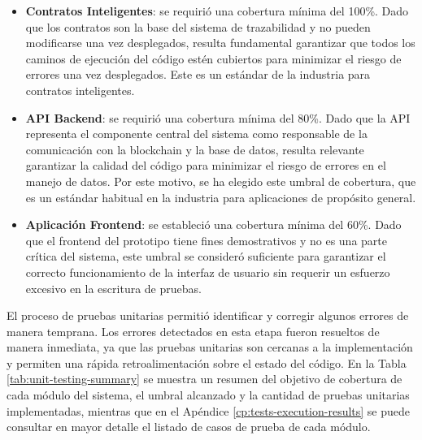\begin{itemize}
\item \textbf{Contratos Inteligentes}: se requirió una cobertura mínima del 100\%. Dado que los contratos son la base del sistema de trazabilidad y no pueden modificarse una vez desplegados, resulta fundamental garantizar que todos los caminos de ejecución del código estén cubiertos para minimizar el riesgo de errores una vez desplegados. Este es un estándar de la industria para contratos inteligentes.
\item \textbf{API Backend}: se requirió una cobertura mínima del 80\%. Dado que la API representa el componente central del sistema como responsable de la comunicación con la blockchain y la base de datos, resulta relevante garantizar la calidad del código para minimizar el riesgo de errores en el manejo de datos. Por este motivo, se ha elegido este umbral de cobertura, que es un estándar habitual en la industria para aplicaciones de propósito general.
\item \textbf{Aplicación Frontend}: se estableció una cobertura mínima del 60\%. Dado que el frontend del prototipo tiene fines demostrativos y no es una parte crítica del sistema, este umbral se consideró suficiente para garantizar el correcto funcionamiento de la interfaz de usuario sin requerir un esfuerzo excesivo en la escritura de pruebas.
\end{itemize}

El proceso de pruebas unitarias permitió identificar y corregir algunos errores de manera temprana. Los errores detectados en esta etapa fueron resueltos de manera inmediata, ya que las pruebas unitarias son cercanas a la implementación y permiten una rápida retroalimentación sobre el estado del código. En la Tabla \ref{tab:unit-testing-summary} se muestra un resumen del objetivo de cobertura de cada módulo del sistema, el umbral alcanzado y la cantidad de pruebas unitarias implementadas, mientras que en el Apéndice \ref{cp:tests-execution-results} se puede consultar en mayor detalle el listado de casos de prueba de cada módulo.

